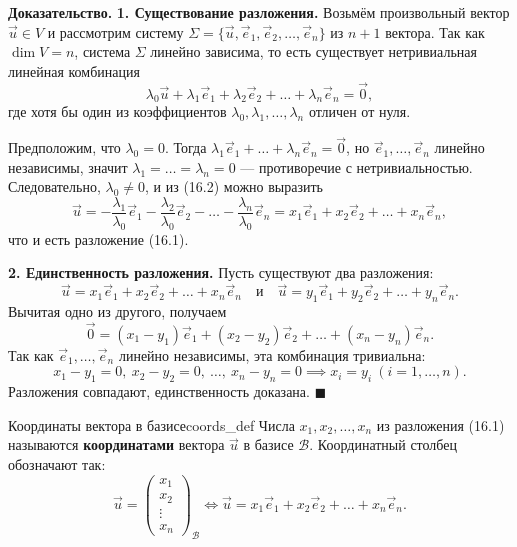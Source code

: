 \documentclass[12pt,a4paper]{article}
\newenvironment{myproof}{\noindent\textbf{Доказательство.}}{\hfill$\blacksquare$}
\begin{document}
\begin{myproof}
  \textbf{1. Существование разложения.}
  Возьмём произвольный вектор $\vec{u} \in V$ и рассмотрим систему
  $\Sigma = \{\vec{u}, \vec{e}_1, \vec{e}_2, \dots, \vec{e}_n\}$ из
  $n+1$ вектора. Так как $\dim V = n$, система $\Sigma$ линейно
  зависима, то есть существует нетривиальная линейная комбинация
  \begin{equation}
    \lambda_0 \vec{u} + \lambda_1 \vec{e}_1 + \lambda_2 \vec{e}_2 +
    \dots + \lambda_n \vec{e}_n = \vec{0},
    \tag{16.2}
  \end{equation}
  где хотя бы один из коэффициентов $\lambda_0, \lambda_1, \dots,
  \lambda_n$ отличен от нуля.

  Предположим, что $\lambda_0 = 0$. Тогда $\lambda_1 \vec{e}_1 + \dots
  + \lambda_n \vec{e}_n = \vec{0}$, но $\vec{e}_1, \dots, \vec{e}_n$
  линейно независимы, значит $\lambda_1 = \dots = \lambda_n = 0$ ---
  противоречие с нетривиальностью. Следовательно, $\lambda_0 \neq 0$, и
  из (16.2) можно выразить
  \[
    \vec{u} = -\frac{\lambda_1}{\lambda_0}\vec{e}_1 -
    \frac{\lambda_2}{\lambda_0}\vec{e}_2 - \dots -
    \frac{\lambda_n}{\lambda_0}\vec{e}_n = x_1\vec{e}_1 +
    x_2\vec{e}_2 + \dots + x_n\vec{e}_n,
  \]
  что и есть разложение (16.1).

  \medskip
  \textbf{2. Единственность разложения.}
  Пусть существуют два разложения:
  \[
    \vec{u} = x_1\vec{e}_1 + x_2\vec{e}_2 + \dots + x_n\vec{e}_n
    \quad \text{и} \quad
    \vec{u} = y_1\vec{e}_1 + y_2\vec{e}_2 + \dots + y_n\vec{e}_n.
  \]
  Вычитая одно из другого, получаем
  \[
    \vec{0} = (x_1 - y_1)\vec{e}_1 + (x_2 - y_2)\vec{e}_2 + \dots +
    (x_n - y_n)\vec{e}_n.
  \]
  Так как $\vec{e}_1, \dots, \vec{e}_n$ линейно независимы, эта
  комбинация тривиальна:
  \[
    x_1 - y_1 = 0, \ x_2 - y_2 = 0, \ \dots, \ x_n - y_n = 0
    \implies x_i = y_i \ (i = 1, \dots, n).
  \]
  Разложения совпадают, единственность доказана.
\end{myproof}

\begin{definition}{Координаты вектора в базисе}{coords_def}
  Числа $x_1, x_2, \dots, x_n$ из разложения (16.1) называются
  \textbf{координатами} вектора $\vec{u}$ в базисе $\mathcal{B}$.
  Координатный столбец обозначают так:
  \[
    \vec{u} =
    \begin{pmatrix} x_1 \\ x_2 \\ \vdots \\ x_n
    \end{pmatrix}_{\mathcal{B}}
    \iff
    \vec{u} = x_1\vec{e}_1 + x_2\vec{e}_2 + \dots + x_n\vec{e}_n.
  \]
\end{definition}
\end{document}
